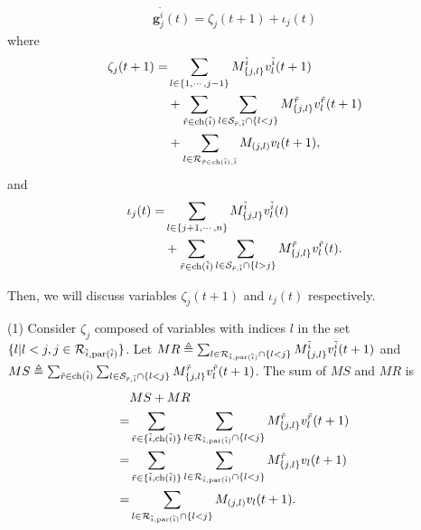 \documentclass[journal]{IEEEtran}
\begin{document}
\begin{align}\label{Phi_com}
\mathbf{g}^{\tilde{i}}_j(t)=\zeta_j(t+1)+\iota_j
(t)
\end{align} 
where 
\begin{align*}
\zeta_j(t+1)=&\sum_{l\in  \{1,\cdots,j-1\}} M^{\tilde{i}}_{\{j,l\}} {v}_l^{\tilde{i}}(t+1)\\
&+\sum_{\tilde{r}\in {\rm ch}(\tilde{i})}\sum_{l\in \mathcal{S}_{\tilde{r},\tilde{i}}\cap \{l<j\}} M_{\{j,l\}}^{\tilde{r}} v_{l}^{\tilde{r}}(t+1)\\
&+\sum_{l\in \mathcal{R}_{\tilde{r}\in {\rm ch}(\tilde{i}),\tilde{i}}} M_{(j,l)} v_{l}(t+1),
\end{align*} 
and 
\begin{align*}
\iota_j
(t)=&\sum_{l\in \{j+1,\cdots,n\}} M^{\tilde{i}}_{\{j,l\}} {v}_l^{\tilde{i}}(t)\\
&+\sum_{\tilde{r}\in {\rm ch}(\tilde{i})}\sum_{l\in \mathcal{S}_{\tilde{r},\tilde{i}}\cap \{l>j\}} M_{\{j,l\}}^{\tilde{r}} v_{l}^{\tilde{r}}(t).
\end{align*}
\par  Then, we will discuss variables $\zeta_j(t+1)$ and $\iota_j(t)$ respectively. 
\par (1) Consider $\zeta_j$ composed of variables with indices $l$ in the set $\{l|l<j,j\in \mathcal{R}_{\tilde{i},{\rm par}(\tilde{i})}\}$. Let $MR\triangleq\sum_{l\in \mathcal{R}_{\tilde{i},{\rm par}(\tilde{i})}\cap \{l<j\}} M^{\tilde{i}}_{\{j,l\}} {v}_l^{\tilde{i}}(t+1)$ and $MS\triangleq\sum_{\tilde{r}\in {\rm ch}(\tilde{i})}\sum_{l\in \mathcal{S}_{\tilde{r},\tilde{i}}\cap \{l<j\}} M_{\{j,l\}}^{\tilde{r}} v_{l}^{\tilde{r}}(t+1)$. The sum of $MS$ and $MR$ is
\begin{align}\label{lj2}
&MS+MR\notag\\
=&\sum_{\tilde{r}\in \{\tilde{i},{\rm ch}(\tilde{i})\}}\sum_{l\in  \mathcal{R}_{\tilde{i},{\rm par}(\tilde{i})} \cap \{l<j\}} M_{\{j,l\}}^{\tilde{r}} v_{l}^{\tilde{r}}(t+1)\notag\\
=&\sum_{\tilde{r}\in \{\tilde{i},{\rm ch}(\tilde{i})\}}\sum_{l\in  \mathcal{R}_{\tilde{i},{\rm par}(\tilde{i})} \cap \{l<j\}} M^{\tilde{r}}_{\{j,l\}}v_l(t+1)\notag\\
=&\sum_{l\in  \mathcal{R}_{\tilde{i},{\rm par}(\tilde{i})} \cap \{l<j\}} M_{(j,l)}v_l(t+1).
 \end{align}
\end{document}
